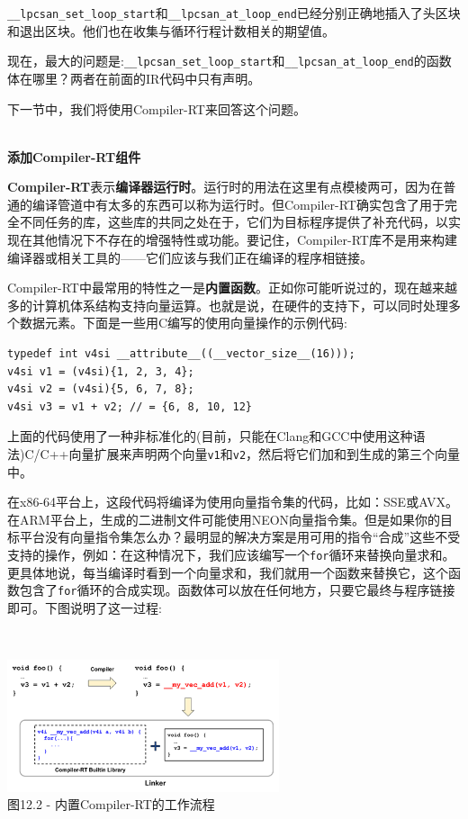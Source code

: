 \texttt{\_\_lpcsan\_set\_loop\_start}和\texttt{\_\_lpcsan\_at\_loop\_end}已经分别正确地插入了头区块和退出区块。他们也在收集与循环行程计数相关的期望值。

现在，最大的问题是:\texttt{\_\_lpcsan\_set\_loop\_start}和\texttt{\_\_lpcsan\_at\_loop\_end}的函数体在哪里？两者在前面的IR代码中只有声明。

下一节中，我们将使用Compiler-RT来回答这个问题。

\hspace*{\fill} \\ %
\noindent
\textbf{添加Compiler-RT组件}

\textbf{Compiler-RT}表示\textbf{编译器运行时}。运行时的用法在这里有点模棱两可，因为在普通的编译管道中有太多的东西可以称为运行时。但Compiler-RT确实包含了用于完全不同任务的库，这些库的共同之处在于，它们为目标程序提供了补充代码，以实现在其他情况下不存在的增强特性或功能。要记住，Compiler-RT库不是用来构建编译器或相关工具的——它们应该与我们正在编译的程序相链接。

Compiler-RT中最常用的特性之一是\textbf{内置函数}。正如你可能听说过的，现在越来越多的计算机体系结构支持向量运算。也就是说，在硬件的支持下，可以同时处理多个数据元素。下面是一些用C编写的使用向量操作的示例代码:

\begin{lstlisting}[style=styleCXX]
typedef int v4si __attribute__((__vector_size__(16)));
v4si v1 = (v4si){1, 2, 3, 4};
v4si v2 = (v4si){5, 6, 7, 8};
v4si v3 = v1 + v2; // = {6, 8, 10, 12}
\end{lstlisting}


上面的代码使用了一种非标准化的(目前，只能在Clang和GCC中使用这种语法)C/C++向量扩展来声明两个向量\texttt{v1}和\texttt{v2}，然后将它们加和到生成的第三个向量中。

在x86-64平台上，这段代码将编译为使用向量指令集的代码，比如：SSE或AVX。在ARM平台上，生成的二进制文件可能使用NEON向量指令集。但是如果你的目标平台没有向量指令集怎么办？最明显的解决方案是用可用的指令“合成”这些不受支持的操作，例如：在这种情况下，我们应该编写一个\texttt{for}循环来替换向量求和。更具体地说，每当编译时看到一个向量求和，我们就用一个函数来替换它，这个函数包含了\texttt{for}循环的合成实现。函数体可以放在任何地方，只要它最终与程序链接即可。下图说明了这一过程:

\hspace*{\fill} \\ %
\begin{center}
\includegraphics[width=0.6\textwidth]{content/3/chapter12/images/2.png}\\
图12.2 - 内置Compiler-RT的工作流程
\end{center}

